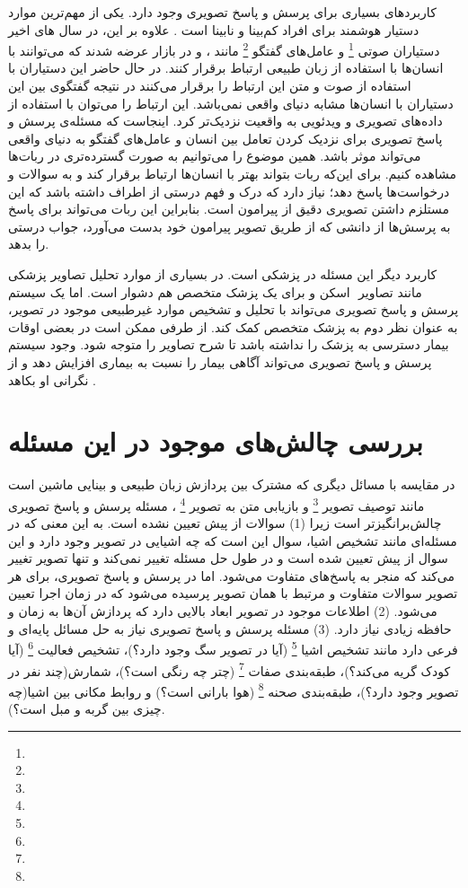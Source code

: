 	کاربردهای بسیاری برای پرسش و پاسخ تصویری وجود دارد. یکی از مهم‌ترین موارد دستیار هوشمند برای افراد کم‌بینا و نابینا  است
	\cite{gurari2018vizwiz}.
	علاوه بر این، در سال های اخیر دستیاران صوتی
 	\footnote{}
   و عامل‌های گفتگو
    \footnote{}
     مانند  
	،
و
	در بازار عرضه شدند که می‌توانند با انسان‌ها با استفاده از زبان طبیعی ارتباط برقرار کنند. در حال حاضر این دستیاران با استفاده از صوت و متن این ارتباط را برقرار می‌کنند در نتیجه گفتگوی بین این دستیاران با انسان‌ها مشابه دنیای واقعی نمی‌باشد. این ارتباط را می‌توان با استفاده از داده‌های تصویری و ویدئویی به واقعیت نزدیک‌تر کرد. اینجاست که مسئله‌ی پرسش و پاسخ تصویری برای نزدیک کردن تعامل بین انسان و عامل‌های گفتگو به دنیای واقعی می‌تواند موثر باشد.  همین موضوع را می‌توانیم به صورت گسترده‌تری در ربات‌ها مشاهده کنیم. برای این‌که ربات بتواند بهتر با انسان‌ها ارتباط برقرار کند و به سوالات و درخواست‌ها پاسخ دهد؛ نیاز دارد که درک و فهم درستی از اطراف داشته باشد که این مستلزم داشتن تصویری دقیق از پیرامون است. بنابراین این ربات می‌تواند برای پاسخ به پرسش‌ها از دانشی که از طریق تصویر پیرامون خود بدست می‌آورد، جواب درستی را بدهد. 
  
  کاربرد دیگر این مسئله در پزشکی است. در بسیاری از موارد تحلیل تصاویر پزشکی مانند تصاویر
   ‌ اسکن و 
   برای یک پزشک متخصص هم دشوار است. اما یک سیستم پرسش و پاسخ تصویری می‌تواند با تحلیل و تشخیص موارد غیرطبیعی موجود در تصویر، به عنوان نظر دوم به پزشک متخصص کمک کند. از طرفی ممکن است در بعضی اوقات بیمار دسترسی به پزشک را نداشته باشد تا شرح تصاویر را متوجه شود. وجود سیستم پرسش و پاسخ تصویری می‌تواند آگاهی بیمار را نسبت به بیماری افزایش دهد و از نگرانی او بکاهد
   \cite{talafha2018just}.

\section{بررسی چالش‌های موجود در این مسئله}
	در مقایسه با مسائل دیگری که مشترک بین پردازش زبان طبیعی و بینایی ماشین است مانند توصیف تصویر
	\footnote{}
	و بازیابی متن به تصویر
	\footnote{}
	، مسئله پرسش و پاسخ تصویری چالش‌برانگیزتر است زیرا (1)  سوالات از پیش تعیین نشده است. به این معنی که در مسئله‌ای مانند تشخیص اشیا، سوال این است که چه اشیایی در تصویر وجود دارد و این سوال از پیش تعیین شده است و در طول حل مسئله تغییر نمی‌کند و تنها تصویر تغییر می‌کند که منجر به پاسخ‌های متفاوت می‌شود. اما در پرسش و پاسخ تصویری، برای هر تصویر سوالات متفاوت و مرتبط با همان تصویر پرسیده می‌شود که در زمان اجرا تعیین می‌شود. (2) اطلاعات موجود در تصویر ابعاد بالایی دارد که پردازش آن‌ها به زمان و حافظه زیادی نیاز دارد. (3) مسئله پرسش و پاسخ تصویری نیاز به حل مسائل پایه‌ای  و فرعی دارد مانند تشخیص اشیا
	\footnote{}
	(آیا در تصویر سگ وجود دارد؟)، تشخیص فعالیت
	\footnote{}
	(آیا کودک گریه می‌کند؟)، طبقه‌بندی صفات
	\footnote{}
	(چتر چه رنگی است؟)، شمارش(چند نفر در تصویر وجود دارد؟)، طبقه‌بندی صحنه
	\footnote{}
	(هوا بارانی است؟) و روابط مکانی بین اشیا(چه چیزی بین گربه و مبل است؟).

